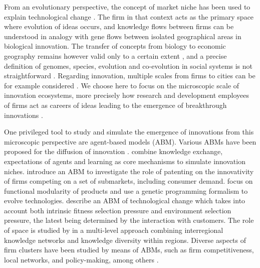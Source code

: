 \documentclass[letterpaper]{article}
\begin{document}
From an evolutionary perspective, the concept of market niche has been used to explain technological change \citep{schot2007niches}. The firm in that context acts as the primary space where evolution of ideas occurs, and knowledge flows between firms can be understood in analogy with gene flows between isolated geographical areas in biological innovation. The transfer of concepts from biology to economic geography remains however valid only to a certain extent \citep{schamp2010notion}, and a precise definition of genomes, species, evolution and co-evolution in social systems is not straightforward \citep{raimbault2019modeling}. Regarding innovation, multiple scales from firms to cities can be for example considered \citep{raimbault2020model}. We choose here to focus on the microscopic scale of innovation ecosystems, more precisely how research and development employees of firms act as careers of ideas leading to the emergence of breakthrough innovations \citep{song2016innovation}.

One privileged tool to study and simulate the emergence of innovations from this microscopic perspective are agent-based models (ABM). Various ABMs have been proposed for the diffusion of innovation \citep{kiesling2012agent}. \cite{lopolito2013emerging} combine knowledge exchange, expectations of agents and learning as core mechanisms to simulate innovation niches. \cite{dosi2021patents} introduce an ABM to investigate the role of patenting on the innovativity of firms competing on a set of submarkets, including consumer demand. \cite{chen2006functional} focus on functional modularity of products and use a genetic programming formalism to evolve technologies. \cite{ma2005agent} describe an ABM of technological change which takes into account both intrinsic fitness selection pressure and environment selection pressure, the latest being determined by the interaction with customers. The role of space is studied by \cite{vermeulen2018role} in a multi-level approach combining interregional knowledge networks and knowledge diversity within regions. Diverse aspects of firm clusters have been studied by means of ABMs, such as firm competitiveness, local networks, and policy-making, among others \citep{fioretti2005agent}.
\end{document}
